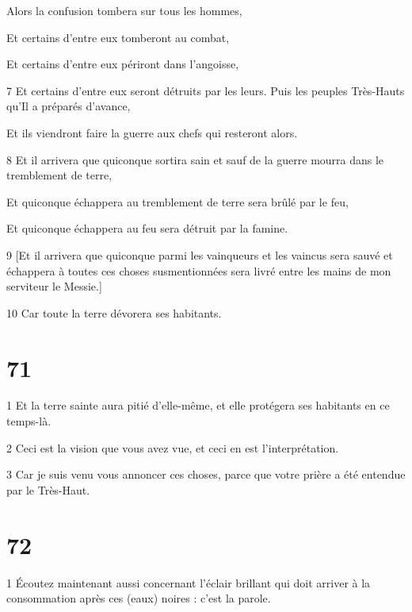 \par Alors la confusion tombera sur tous les hommes,

\par Et certains d'entre eux tomberont au combat,

\par Et certains d'entre eux périront dans l'angoisse,

\par 7 Et certains d'entre eux seront détruits par les leurs. Puis les peuples Très-Hauts qu'Il a préparés d'avance,

\par Et ils viendront faire la guerre aux chefs qui resteront alors.

\par 8 Et il arrivera que quiconque sortira sain et sauf de la guerre mourra dans le tremblement de terre,

\par Et quiconque échappera au tremblement de terre sera brûlé par le feu,

\par Et quiconque échappera au feu sera détruit par la famine.

\par 9 [Et il arrivera que quiconque parmi les vainqueurs et les vaincus sera sauvé et échappera à toutes ces choses susmentionnées sera livré entre les mains de mon serviteur le Messie.]

\par 10 Car toute la terre dévorera ses habitants.

\chapter{71}

\par 1 Et la terre sainte aura pitié d'elle-même, et elle protégera ses habitants en ce temps-là.

\par 2 Ceci est la vision que vous avez vue, et ceci en est l'interprétation.

\par 3 Car je suis venu vous annoncer ces choses, parce que votre prière a été entendue par le Très-Haut.

\chapter{72}

\par 1 Écoutez maintenant aussi concernant l'éclair brillant qui doit arriver à la consommation après ces (eaux) noires : c'est la parole.

